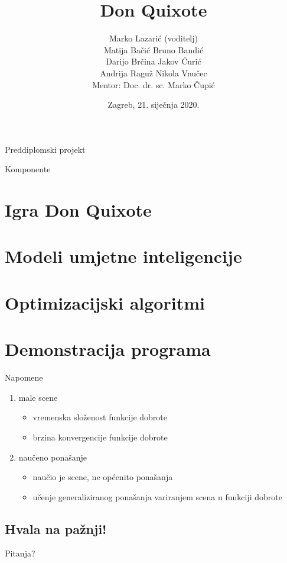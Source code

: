 \documentclass{beamer}
\title{Don Quixote}
\date{\vspace{1em}Zagreb, 21. siječnja 2020.}
\institute{Fakultet elektrotehnike i računarstva}
\author{Marko Lazarić (voditelj)  \\ Matija Bačić \hspace*{10em} Bruno Bandić \\ Darijo Brčina \hspace*{9.75em} Jakov Ćurić \\ Andrija Raguž \hspace*{9.3em} Nikola Vnučec \\[1em] Mentor: Doc. dr. sc. Marko Čupić}
\begin{document}
  \begin{frame}
  	\centering
  	\vspace{2em}
  	Preddiplomski projekt
  	\vspace{-4em}
  	
  	\titlepage
  \end{frame}

  \begin{frame}{Komponente}
	\tableofcontents
  \end{frame}

  \section{Igra Don Quixote}
  

  \section{Modeli umjetne inteligencije}
  

  \section{Optimizacijski algoritmi}
  

  \section*{Demonstracija programa}

  \begin{frame}{Napomene}
	\begin{enumerate}
	  \item male scene
	  \begin{itemize}
	    \item vremenska složenost funkcije dobrote
	    \item brzina konvergencije funkcije dobrote\\[2em]
	  \end{itemize} 
	  \item naučeno ponašanje
	  \begin{itemize}
	    \item naučio je scene, ne općenito ponašanja
	    \item učenje generaliziranog ponašanja variranjem scena u funkciji dobrote
	  \end{itemize}
	\end{enumerate}
  \end{frame}
  
  \begin{frame}[plain]
  	\section*{Hvala na pažnji!}
  	\hspace{15em}Pitanja?
  \end{frame}
  
\end{document}
